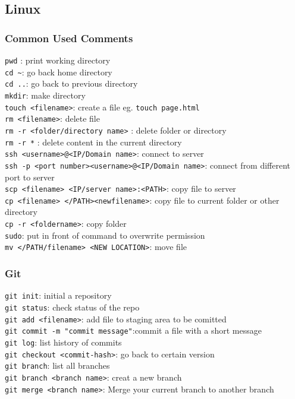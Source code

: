 \subsection{Linux}
\subsubsection{Common Used Comments}
\texttt{pwd} : print working directory \\
\texttt{cd \~}: go back home directory \\ 
\texttt{cd ..}: go back to previous directory \\
\texttt{mkdir}: make directory \\
\texttt{touch <filename>}: create a file eg. \texttt{touch page.html} \\
\texttt{rm <filename>}: delete file \\
\texttt{rm -r <folder/directory name>} : delete folder or directory\\
\texttt{rm -r *} : delete content in the current directory\\
\texttt{ssh <username>@<IP/Domain name>}: connect to server \\
\texttt{ssh -p <port number><username>@<IP/Domain name>}: connect from different port to server \\
\texttt{scp <filename> <IP/server name>:<PATH>}: copy file to server \\
\texttt{cp <filename> <\~/PATH><newfilename>}: copy file to current folder or other directory \\
\texttt{cp -r <foldername>}: copy folder \\
\texttt{sudo}: put in front of command to overwrite permission \\
\texttt{mv <\~/PATH/filename> <NEW LOCATION>}: move file \\
\subsubsection{Git}
\texttt{git init}: initial a repository\\
\texttt{git status}: check status of the repo\\
\texttt{git add <filename>}: add file to staging area to be comitted \\
\texttt{git commit -m "commit message"}:commit a file with a short message\\
\texttt{git log}: list history of commits\\
\texttt{git checkout <commit-hash>}: go back to certain version\\
\texttt{git branch}: list all branches\\
\texttt{git branch <branch name>}: creat a new branch\\
\texttt{git merge <branch name>}: Merge your current branch to another branch\\
